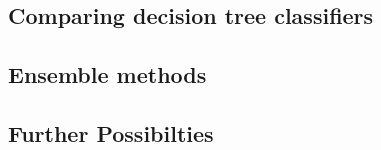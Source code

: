 \documentclass[11pt,a4paper]{article}
\begin{document}
\subsection{Comparing decision tree classifiers}

\subsection{Ensemble methods}

\subsection{Further Possibilties}



\end{document}
